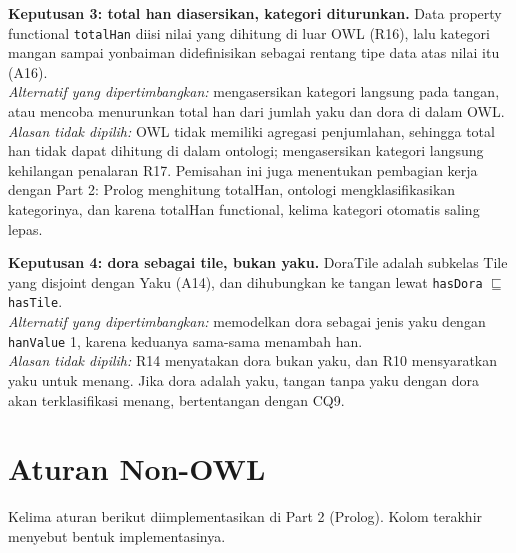 \documentclass[11pt,a4paper]{article}
\begin{document}
\textbf{Keputusan 3: total han diasersikan, kategori diturunkan.}
Data property functional \texttt{totalHan} diisi nilai yang dihitung di luar OWL
(R16), lalu kategori mangan sampai yonbaiman didefinisikan sebagai rentang tipe data
atas nilai itu (A16).\\
\textit{Alternatif yang dipertimbangkan:} mengasersikan kategori langsung pada
tangan, atau mencoba menurunkan total han dari jumlah yaku dan dora di dalam OWL.\\
\textit{Alasan tidak dipilih:} OWL tidak memiliki agregasi penjumlahan, sehingga
total han tidak dapat dihitung di dalam ontologi; mengasersikan kategori langsung
kehilangan penalaran R17. Pemisahan ini juga menentukan pembagian kerja dengan
Part 2: Prolog menghitung totalHan, ontologi mengklasifikasikan kategorinya, dan
karena totalHan functional, kelima kategori otomatis saling lepas.

\textbf{Keputusan 4: dora sebagai tile, bukan yaku.} DoraTile adalah subkelas Tile yang
disjoint dengan Yaku (A14), dan dihubungkan ke tangan lewat \texttt{hasDora}
$\sqsubseteq$ \texttt{hasTile}.\\
\textit{Alternatif yang dipertimbangkan:} memodelkan dora sebagai jenis yaku dengan
\texttt{hanValue} 1, karena keduanya sama-sama menambah han.\\
\textit{Alasan tidak dipilih:} R14 menyatakan dora bukan yaku, dan R10 mensyaratkan
yaku untuk menang. Jika dora adalah yaku, tangan tanpa yaku dengan dora akan
terklasifikasi menang, bertentangan dengan CQ9.

\section{Aturan Non-OWL}

Kelima aturan berikut diimplementasikan di Part 2 (Prolog). Kolom terakhir menyebut
bentuk implementasinya.
\end{document}
